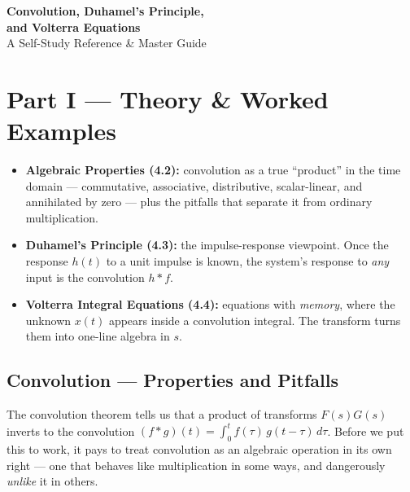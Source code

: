 \documentclass[11pt]{article}
\begin{document}
\begin{center}
    {\Large\bfseries\color{headerblue} Convolution, Duhamel's Principle,\\[2pt] and Volterra Equations}\\[6pt]
    \large A Self-Study Reference \& Master Guide
\end{center}
\vspace{0.4cm}

\tableofcontents
\vspace{0.8cm}

{}
\section*{Part I --- Theory \& Worked Examples}
\setcounter{section}{4}
\setcounter{subsection}{1}

\begin{topicsbox}
\begin{itemize}[leftmargin=*, itemsep=2pt]
  \item \textbf{Algebraic Properties (4.2):} convolution as a true ``product'' in the time domain --- commutative, associative, distributive, scalar-linear, and annihilated by zero --- plus the pitfalls that separate it from ordinary multiplication.
  \item \textbf{Duhamel's Principle (4.3):} the impulse-response viewpoint. Once the response $h(t)$ to a unit impulse is known, the system's response to \emph{any} input is the convolution $h * f$.
  \item \textbf{Volterra Integral Equations (4.4):} equations with \emph{memory}, where the unknown $x(t)$ appears inside a convolution integral. The transform turns them into one-line algebra in $s$.
\end{itemize}
\end{topicsbox}

\subsection{Convolution --- Properties and Pitfalls}

The convolution theorem tells us that a product of transforms $F(s)G(s)$ inverts to the convolution $(f * g)(t) = \int_0^t f(\tau)\,g(t-\tau)\,d\tau$. Before we put this to work, it pays to treat convolution as an algebraic operation in its own right --- one that behaves like multiplication in some ways, and dangerously \emph{unlike} it in others.
\end{document}
